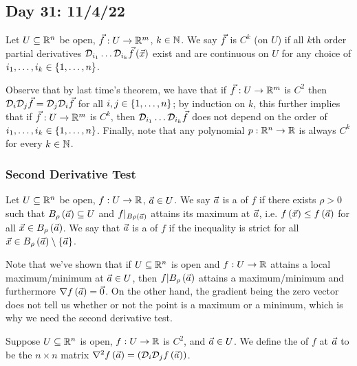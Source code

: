 \documentclass[main.tex]{subfiles}
\begin{document}
\subsection{Day 31: 11/4/22}

\begin{definition}
    Let $U\subseteq \mathbb R^n$ be open, $\vec{f} : U \to \mathbb R^m$, $k\in \mathbb N$. We say $\vec{f}$ is $C^k$ (on $U$) if all $k$th order partial derivatives $\mathcal{D}_{i_1}\ldots \mathcal{D}_{i_k}\vec{f}\left( \vec{x} \right)$ exist and are continuous on $U$ for any choice of $i_1, \ldots , i_k \in \left\{ 1, \ldots , n \right\}$.
\end{definition}

Observe that by last time's theorem, we have that if $\vec{f} : U\to \mathbb R^m$ is $C^2$ then $\mathcal{D}_i\mathcal{D}_j\vec{f} = \mathcal{D}_j\mathcal{D}_i\vec{f}$ for all $i, j\in \left\{ 1, \ldots , n \right\}$; by induction on $k$, this further implies that if $\vec{f} : U \to \mathbb R^m$ is $C^k$, then $\mathcal{D}_{i_1}\ldots \mathcal{D}_{i_k}\vec{f}$ does not depend on the order of $i_1, \ldots , i_k\in \left\{ 1, \ldots , n \right\}$. Finally, note that any polynomial $p : \mathbb R^n \to \mathbb R$ is always $C^k$ for every $k\in \mathbb N$.

\subsubsection{Second Derivative Test}

\begin{definition}
    Let $U\subseteq \mathbb R^n$ be open, $f : U \to \mathbb R$, $\vec{a} \in U$. We say $\vec{a}$ is a  of $f$ if there exists $\rho > 0$ such that $B_\rho\left( \vec{a} \right) \subseteq U$ and $f|_{B\rho\left( \vec{a} \right)}$ attains its maximum at $\vec{a}$, i.e. $f\left( \vec{x} \right) \le f\left( \vec{a} \right)$ for all $\vec{x}\in B_\rho\left( \vec{a} \right)$. We say that $\vec{a}$ is a  of $f$ if the inequality is strict for all $\vec{x}\in B_\rho\left( \vec{a} \right)\setminus\left\{ \vec{a} \right\}$.
\end{definition}

Note that we've shown that if $U\subseteq \mathbb R^n$ is open and $f : U \to \mathbb R$ attains a local maximum/minimum at $\vec{a}\in U$, then $f|{B_\rho\left( \vec{a} \right)}$ attains a maximum/minimum and furthermore $\nabla f\left( \vec{a} \right) = \vec{0}$. On the other hand, the gradient being the zero vector does not tell us whether or not the point is a maximum or a minimum, which is why we need the second derivative test.

\begin{definition}
    Suppose $U\subseteq \mathbb R^n$ is open, $f : U \to \mathbb R$ is $C^2$, and $\vec{a}\in U$. We define the  of $f$ at $\vec{a}$ to be the $n\times n$ matrix $\nabla^2 f\left( \vec{a} \right) = \left( \mathcal{D}_i\mathcal{D}_jf\left( \vec{a} \right) \right)$.
\end{definition}
\end{document}
